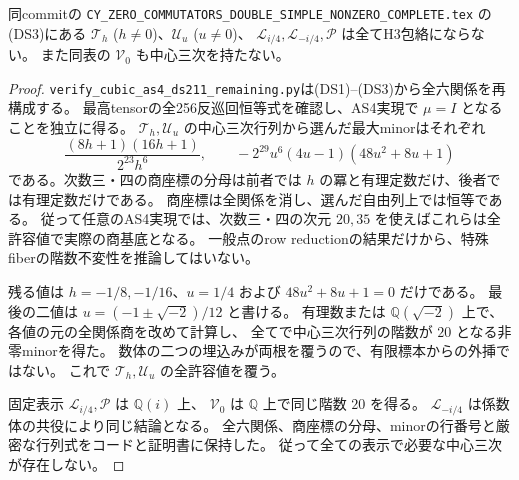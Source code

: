 \begin{theorem}[残る二族と固定表示の三次核消滅]
\label{thm:ds211-TU-fixed-excluded}
同commitの
{\small\texttt{CY\_\allowbreak{}ZERO\_\allowbreak{}COMMUTATORS\_\allowbreak{}DOUBLE\_\allowbreak{}SIMPLE\_\allowbreak{}NONZERO\_\allowbreak{}COMPLETE.tex}}
の(DS3)にある $\mathcal T_h$ ($h\ne0$)、$\mathcal U_u$ ($u\ne0$)、
$\mathcal L_{i/4},\mathcal L_{-i/4},\mathcal P$ は全てH3包絡にならない。
また同表の $\mathcal V_0$ も中心三次を持たない。
\end{theorem}
\begin{proof}
\texttt{verify\_cubic\_as4\_ds211\_remaining.py}は(DS1)--(DS3)から全六関係を再構成する。
最高tensorの全256反巡回恒等式を確認し、AS4実現で $\mu=I$ となることを独立に得る。
$\mathcal T_h,\mathcal U_u$ の中心三次行列から選んだ最大minorはそれぞれ
\[
 \frac{(8h+1)(16h+1)}{2^{23}h^6},\qquad
 -2^{29}u^6(4u-1)(48u^2+8u+1)
\]
である。次数三・四の商座標の分母は前者では $h$ の冪と有理定数だけ、後者では有理定数だけである。
商座標は全関係を消し、選んだ自由列上では恒等である。
従って任意のAS4実現では、次数三・四の次元 $20,35$ を使えばこれらは全許容値で実際の商基底となる。
一般点のrow reductionの結果だけから、特殊fiberの階数不変性を推論してはいない。

残る値は $h=-1/8,-1/16$、$u=1/4$ および $48u^2+8u+1=0$ だけである。
最後の二値は $u=(-1\pm\sqrt{-2})/12$ と書ける。
有理数または $\mathbb Q(\sqrt{-2})$ 上で、各値の元の全関係商を改めて計算し、
全てで中心三次行列の階数が $20$ となる非零minorを得た。
数体の二つの埋込みが両根を覆うので、有限標本からの外挿ではない。
これで $\mathcal T_h,\mathcal U_u$ の全許容値を覆う。

固定表示 $\mathcal L_{i/4},\mathcal P$ は $\mathbb Q(i)$ 上、
$\mathcal V_0$ は $\mathbb Q$ 上で同じ階数 $20$ を得る。
$\mathcal L_{-i/4}$ は係数体の共役により同じ結論となる。
全六関係、商座標の分母、minorの行番号と厳密な行列式をコードと証明書に保持した。
従って全ての表示で必要な中心三次が存在しない。
\end{proof}

